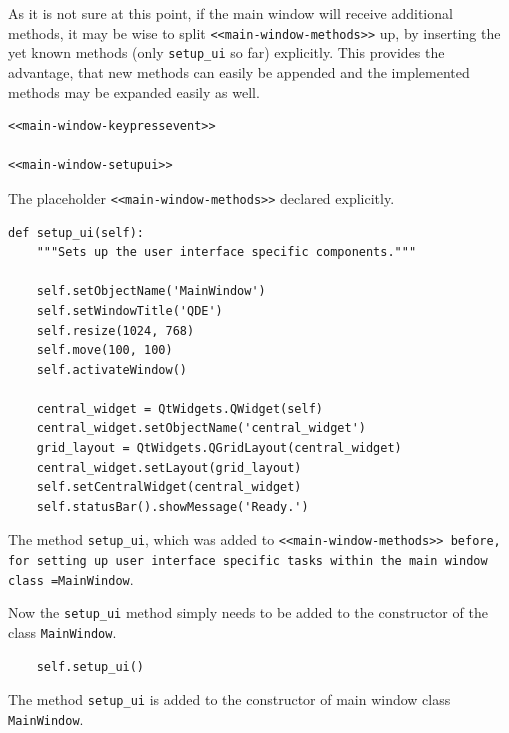 \documentclass[10pt, openright, notitlepage]{scrreprt}
\begin{document}
As it is not sure at this point, if the main window will receive additional
methods, it may be wise to split \texttt{<<main-window-methods>>} up, by inserting the
yet known methods (only \texttt{setup\_ui} so far) explicitly. This provides the
advantage, that new methods can easily be appended and the implemented methods
may be expanded easily as well.

\begin{listing}[H]
\begin{verbatim}
<<main-window-keypressevent>>

<<main-window-setupui>>
\end{verbatim}
\caption{\label{main-window-methods}
The placeholder \texttt{<<main-window-methods>>} declared explicitly.}
\end{listing}

\begin{listing}[H]
\begin{verbatim}
def setup_ui(self):
    """Sets up the user interface specific components."""

    self.setObjectName('MainWindow')
    self.setWindowTitle('QDE')
    self.resize(1024, 768)
    self.move(100, 100)
    self.activateWindow()

    central_widget = QtWidgets.QWidget(self)
    central_widget.setObjectName('central_widget')
    grid_layout = QtWidgets.QGridLayout(central_widget)
    central_widget.setLayout(grid_layout)
    self.setCentralWidget(central_widget)
    self.statusBar().showMessage('Ready.')
\end{verbatim}
\caption{\label{main-window-setupui}
The method \texttt{setup\_ui}, which was added to \texttt{<<main-window-methods>> before, for setting up user interface specific tasks within the main window class =MainWindow}.}
\end{listing}

Now the \texttt{setup\_ui} method simply needs to be added to the constructor of the
class \texttt{MainWindow}.

\begin{listing}[H]
\begin{verbatim}
    self.setup_ui()
\end{verbatim}
\caption{\label{main-window-constructor}
The method \texttt{setup\_ui} is added to the constructor of main window class \texttt{MainWindow}.}
\end{listing}
\end{document}
